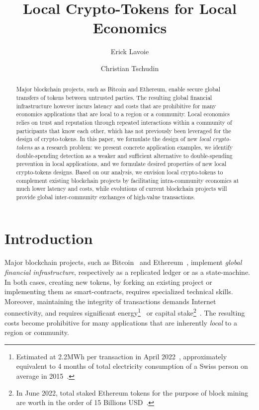 \documentclass[sigplan,screen,10pt,review,anonymous]{acmart}
\begin{document}
\title{Local Crypto-Tokens for Local Economics}

\author{Erick Lavoie}

\author{Christian Tschudin}


\begin{abstract}
Major blockchain projects, such as Bitcoin and Ethereum, enable secure global transfers of tokens between untrusted parties. The resulting global financial infrastructure however incurs latency and costs that are prohibitive for many economics applications that are local to a region or a community. Local economics relies on trust and reputation through repeated interactions within a community of participants that know each other, which has not previously been leveraged for the design of crypto-tokens. In this paper, we formulate the design of new \textit{local crypto-tokens} as a research problem: we present concrete application examples, we identify double-spending detection as a weaker and sufficient alternative to double-spending prevention in local applications, and we formulate desired properties of new local crypto-tokens designs. Based on our analysis, we envision local crypto-tokens to complement existing blockchain projects by facilitating intra-community economics at much lower latency and costs, while evolutions of current blockchain projects will provide global inter-community exchanges of high-value transactions.
\end{abstract}

\maketitle

\section{Introduction}

Major blockchain projects, such as Bitcoin~\cite{nakamoto2008bitcoin} and Ethereum~\cite{buterin2014next}, implement \textit{global financial infrastructure}, respectively as a replicated ledger or as a state-machine. In both cases, creating new tokens, by forking an existing project or implementing them as smart-contracts, requires specialized technical skills. Moreover, maintaining the integrity of transactions demands Internet connectivity, and requires significant energy\footnote{Estimated at 2.2MWh per transaction in April 2022~\cite{bitcoin-transaction-energy}, approximately equivalent to 4 months of total electricity consumption of a Swiss person on average in 2015~\cite{average-energy-consumption-per-capita-ch}.}~\cite{vranken2017sustainability,sedlmeir2020energy} or capital stake\footnote{In June 2022, total staked Ethereum tokens for the purpose of block mining are worth in the order of 15 Billions USD~\cite{proof-of-stake}.}~\cite{sedlmeir2020energy}. The resulting costs become prohibitive for many applications that are inherently \textit{local} to a region or community.
\end{document}
